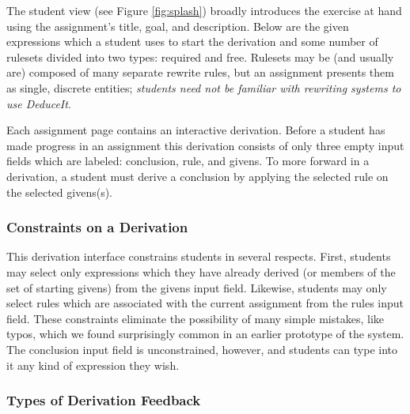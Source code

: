 \documentclass{sigchi}
\begin{document}
The student view (see Figure \ref{fig:splash}) broadly introduces the exercise at hand using the assignment's title, goal, and description. Below are the given expressions which a student uses to start the derivation and some number of rulesets divided into two types: required and free. Rulesets may be (and usually are) composed of many separate rewrite rules, but an assignment presents them as single, discrete entities; \textit{students need not be familiar with rewriting systems to use DeduceIt}. %

Each assignment page contains an interactive derivation. Before a student has made progress in an assignment this derivation consists of only three empty input fields which are labeled: conclusion, rule, and givens. To more forward in a derivation, a student must derive a conclusion by applying the selected rule on the selected givens(s). 

\subsubsection{Constraints on a Derivation}

This derivation interface constrains students in several respects. First, students may select only expressions which they have already derived (or members of the set of starting givens) from the givens input field. Likewise, students may only select rules which are associated with the current assignment from the rules input field. These constraints eliminate the possibility of many simple mistakes, like typos, which we found surprisingly common in an earlier prototype of the system. The conclusion input field is unconstrained, however, and students can type into it any kind of expression they wish.

\subsubsection{Types of Derivation Feedback}
\end{document}
